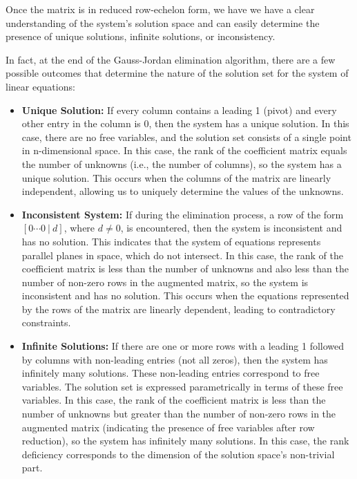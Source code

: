 Once the matrix is in reduced row-echelon form, we have we have a clear understanding of the system's solution space and can easily determine the presence of unique solutions, infinite solutions, or inconsistency.

In fact, at the end of the Gauss-Jordan elimination algorithm, there are a few possible outcomes that determine the nature of the solution set for the system of linear equations:

\begin{itemize}
    \item \textbf{Unique Solution:} If every column contains a leading 1 (pivot) and every other entry in the column is 0, then the system has a unique solution. In this case, there are no free variables, and the solution set consists of a single point in n-dimensional space. In this case, the rank of the coefficient matrix equals the number of unknowns (i.e., the number of columns), so the system has a unique solution. This occurs when the columns of the matrix are linearly independent, allowing us to uniquely determine the values of the unknowns.

    \item \textbf{Inconsistent System:} If during the elimination process, a row of the form $[0 \cdots 0 \ | \ d]$, where $d \neq 0$, is encountered, then the system is inconsistent and has no solution. This indicates that the system of equations represents parallel planes in space, which do not intersect. In this case, the rank of the coefficient matrix is less than the number of unknowns and also less than the number of non-zero rows in the augmented matrix, so the system is inconsistent and has no solution. This occurs when the equations represented by the rows of the matrix are linearly dependent, leading to contradictory constraints.

    \item \textbf{Infinite Solutions:} If there are one or more rows with a leading 1 followed by columns with non-leading entries (not all zeros), then the system has infinitely many solutions. These non-leading entries correspond to free variables. The solution set is expressed parametrically in terms of these free variables. In this case, the rank of the coefficient matrix is less than the number of unknowns but greater than the number of non-zero rows in the augmented matrix (indicating the presence of free variables after row reduction), so the system has infinitely many solutions. In this case, the rank deficiency corresponds to the dimension of the solution space's non-trivial part.
    
\end{itemize}

